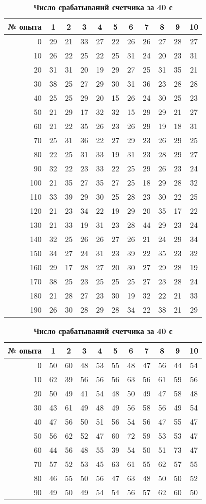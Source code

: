 \documentclass[a4paper, 12pt]{article}%
\begin{document}
\newpage
\begin{table}
\caption{\textbf{Число срабатываний счетчика за 20 с}}
\begin{tabular}{|r|c|c|c|c|c|c|c|c|c|c|}
\hline
№ опыта&1&2&3&4&5&6&7&8&9&10\\
\hline
0&29&21&33&27&22&26&26&27&28&27\\
\hline
10&26&22&25&22&25&31&24&20&23&31\\
\hline
20&31&31&20&19&29&27&25&31&35&21\\
\hline
30&38&25&27&29&30&31&36&23&28&28\\
\hline
40&25&25&29&20&15&26&24&30&25&23\\
\hline
50&21&29&17&32&32&15&29&29&21&27\\
\hline
60&21&22&35&26&23&26&29&19&18&31\\
\hline
70&25&31&36&22&27&29&23&26&29&25\\
\hline
80&22&25&31&33&19&31&23&28&29&27\\
\hline
90&32&22&23&33&22&25&29&26&23&24\\
\hline
100&21&35&27&35&27&25&18&29&28&32\\
\hline
110&33&39&29&30&25&28&23&30&22&25\\
\hline
120&21&23&34&22&19&29&20&35&17&22\\
\hline
130&21&33&19&31&23&28&44&29&23&24\\
\hline
140&32&25&26&26&27&26&21&24&29&34\\
\hline
150&34&27&24&31&23&39&22&35&23&32\\
\hline
160&29&17&28&27&20&30&27&29&28&19\\
\hline
170&38&25&23&25&25&25&27&23&28&24\\
\hline
180&21&28&27&23&30&19&32&22&21&33\\
\hline
190&26&30&28&29&28&34&22&38&21&29\\
\hline
\end{tabular}
\caption{\textbf{Число срабатываний счетчика за 40 с}}
\begin{tabular}{|r|c|c|c|c|c|c|c|c|c|c|}
\hline
№ опыта&1&2&3&4&5&6&7&8&9&10\\
\hline
0&50&60&48&53&55&48&47&56&44&54\\
\hline
10&62&39&56&56&56&63&56&61&59&56\\
\hline
20&50&49&41&54&48&50&49&47&58&48\\
\hline
30&43&61&49&48&49&56&58&56&49&54\\
\hline
40&47&56&50&51&56&54&56&47&55&47\\
\hline
50&56&62&52&47&60&72&59&53&53&47\\
\hline
60&44&56&48&55&39&54&50&51&73&47\\
\hline
70&57&52&53&45&63&61&55&62&57&55\\
\hline
80&46&55&50&56&47&63&48&50&50&52\\
\hline
90&49&50&49&54&54&56&57&62&60&50\\
\hline
\end{tabular}
\end{table}
\end{document}
